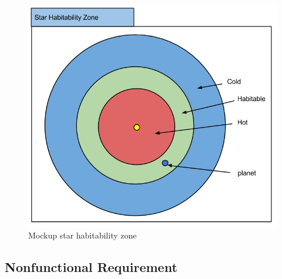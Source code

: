 \begin{enumerate}
\begin{figure}[H]
  \centering
      \includegraphics[width=.5\textwidth]{images/mockStarHabitability.png}
  \caption{Mockup star habitability zone}  
\end{figure}




\end{enumerate}

\subsection{Nonfunctional Requirement}

